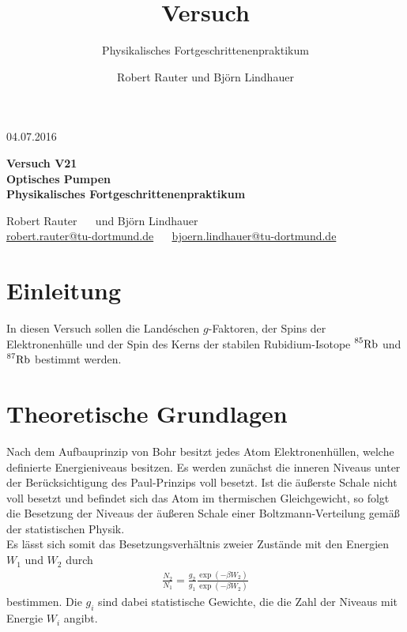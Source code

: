\documentclass[]{scrartcl}
\title{Versuch \versuchnummer\\ \versuchname}
\subtitle{Physikalisches Fortgeschrittenenpraktikum}
\author{Robert Rauter und Björn Lindhauer}
\date{\versuchdatum}
\newcommand{\versuchnummer}{V21}
\newcommand{\versuchname}{Optisches Pumpen}
\newcommand{\versuchdatum}{04.07.2016}
\begin{document}
\begin{titlepage}
{\large \versuchdatum}
\vspace{7cm}
\begin{center}
\textbf{\huge Versuch \versuchnummer}\\
\vspace{0.5cm}
\textbf{\huge \versuchname}\\
\vspace{0.2cm}
\textbf{ Physikalisches Fortgeschrittenenpraktikum}\\
\vspace{9cm}

{\Large Robert Rauter \ \ \hspace{1.5cm} und \hspace{1.5cm} Björn Lindhauer}\\
{ \url{robert.rauter@tu-dortmund.de} \ \ \hspace{2cm} \url{bjoern.lindhauer@tu-dortmund.de}}
\end{center}
\end{titlepage}
\section{Einleitung}
In diesen Versuch sollen die Landéschen $g$-Faktoren, der Spins der Elektronenhülle und der Spin des Kerns der stabilen Rubidium-Isotope $\prescript{85}{}{\text{Rb}}$ und $\prescript{87}{}{\text{Rb}}$ bestimmt werden.
\section{Theoretische Grundlagen}
Nach dem Aufbauprinzip von Bohr besitzt jedes Atom Elektronenhüllen, welche definierte Energieniveaus besitzen. Es werden zunächst die inneren Niveaus unter der Berücksichtigung des Paul-Prinzips voll besetzt. Ist die äußerste Schale nicht voll besetzt und befindet sich das Atom im thermischen Gleichgewicht, so folgt die Besetzung der Niveaus der äußeren Schale einer Boltzmann-Verteilung gemäß der statistischen Physik.\\
Es lässt sich somit das Besetzungsverhältnis zweier Zustände mit den Energien $W_1$ und $W_2$ durch
\begin{align}
\frac{N_2}{N_1}=\frac{g_2}{g_1}\frac{\exp\left(-\beta W_2\right)}{\exp\left(-\beta W_2\right)}\label{eq:besetzungsverhaeltnisthermisch}
\end{align}
bestimmen. Die $g_i$ sind dabei statistische Gewichte, die die Zahl der Niveaus mit Energie $W_i$ angibt.
\end{document}
